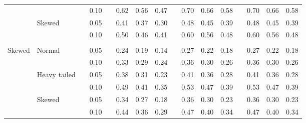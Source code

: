 \documentclass{article} %
\begin{document}
\begin{table}[ht]
\begin{scriptsize}
\begin{center}
\begin{tabular}{ll p{.1cm} c p{.1cm} rrr p{.1cm} rrr p{.1cm} rrr}
             &              && 0.10 &&   0.62 & 0.56 & 0.47 && 0.70 & 0.66 & 0.58 && 0.70 & 0.66 & 0.58 \\ 
             & Skewed       && 0.05 &&   0.41 & 0.37 & 0.30 && 0.48 & 0.45 & 0.39 && 0.48 & 0.45 & 0.39 \\ 
             &              && 0.10 &&   0.50 & 0.46 & 0.41 && 0.60 & 0.56 & 0.48 && 0.60 & 0.56 & 0.48 \\ 
             &&&&&&&&&&&&&&&\\
Skewed       & Normal       && 0.05 &&   0.24 & 0.19 & 0.14 && 0.27 & 0.22 & 0.18 && 0.27 & 0.22 & 0.18 \\ 
             &              && 0.10 &&   0.33 & 0.29 & 0.24 && 0.36 & 0.30 & 0.26 && 0.36 & 0.30 & 0.26 \\ 
             & Heavy tailed && 0.05 &&   0.38 & 0.31 & 0.23 && 0.41 & 0.36 & 0.28 && 0.41 & 0.36 & 0.28 \\ 
             &              && 0.10 &&   0.49 & 0.41 & 0.35 && 0.53 & 0.47 & 0.39 && 0.53 & 0.47 & 0.39 \\ 
             & Skewed       && 0.05 &&   0.34 & 0.27 & 0.18 && 0.36 & 0.30 & 0.23 && 0.36 & 0.30 & 0.23 \\ 
             &              && 0.10 &&   0.44 & 0.36 & 0.29 && 0.47 & 0.40 & 0.34 && 0.47 & 0.40 & 0.34 \\ 



\end{tabular}
\end{center}
\end{scriptsize}
\end{table}
\end{document}
